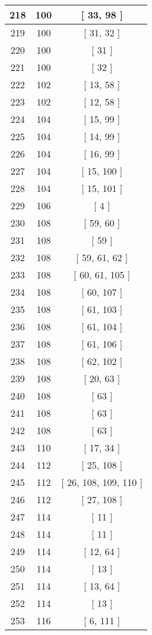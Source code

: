 \begin{center}
\begin{longtable}[H]{|| c c c ||}
\hline
218 & 100 & [ 33, 98 ] \\ 
\hline
219 & 100 & [ 31, 32 ] \\ 
\hline
220 & 100 & [ 31 ] \\ 
\hline
221 & 100 & [ 32 ] \\ 
\hline
222 & 102 & [ 13, 58 ] \\ 
\hline
223 & 102 & [ 12, 58 ] \\ 
\hline
224 & 104 & [ 15, 99 ] \\ 
\hline
225 & 104 & [ 14, 99 ] \\ 
\hline
226 & 104 & [ 16, 99 ] \\ 
\hline
227 & 104 & [ 15, 100 ] \\ 
\hline
228 & 104 & [ 15, 101 ] \\ 
\hline
229 & 106 & [ 4 ] \\ 
\hline
230 & 108 & [ 59, 60 ] \\ 
\hline
231 & 108 & [ 59 ] \\ 
\hline
232 & 108 & [ 59, 61, 62 ] \\ 
\hline
233 & 108 & [ 60, 61, 105 ] \\ 
\hline
234 & 108 & [ 60, 107 ] \\ 
\hline
235 & 108 & [ 61, 103 ] \\ 
\hline
236 & 108 & [ 61, 104 ] \\ 
\hline
237 & 108 & [ 61, 106 ] \\ 
\hline
238 & 108 & [ 62, 102 ] \\ 
\hline
239 & 108 & [ 20, 63 ] \\ 
\hline
240 & 108 & [ 63 ] \\ 
\hline
241 & 108 & [ 63 ] \\ 
\hline
242 & 108 & [ 63 ] \\ 
\hline
243 & 110 & [ 17, 34 ] \\ 
\hline
244 & 112 & [ 25, 108 ] \\ 
\hline
245 & 112 & [ 26, 108, 109, 110 ] \\ 
\hline
246 & 112 & [ 27, 108 ] \\ 
\hline
247 & 114 & [ 11 ] \\ 
\hline
248 & 114 & [ 11 ] \\ 
\hline
249 & 114 & [ 12, 64 ] \\ 
\hline
250 & 114 & [ 13 ] \\ 
\hline
251 & 114 & [ 13, 64 ] \\ 
\hline
252 & 114 & [ 13 ] \\ 
\hline
253 & 116 & [ 6, 111 ] \\ 

\end{longtable}
\end{center}

